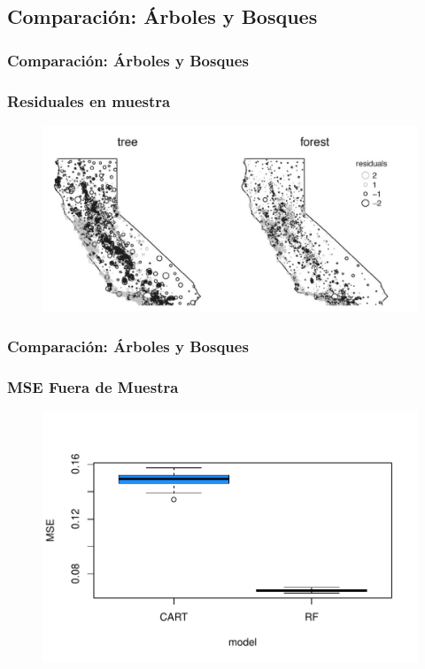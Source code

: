 \documentclass[
  shownotes,
  xcolor={svgnames},
  hyperref={colorlinks,citecolor=DarkBlue,linkcolor=DarkRed,urlcolor=DarkBlue}
  , aspectratio=169]{beamer}
\begin{document}
\subsection{Comparación: Árboles y Bosques}
\begin{frame}[fragile]
\frametitle{Comparación: Árboles y Bosques}
\frametitle{Residuales en muestra}


\begin{figure}[H] \centering
            \captionsetup{justification=centering}
              \includegraphics[scale=0.25]{figures/california}
 \end{figure}


\end{frame}

\begin{frame}[fragile]
\frametitle{Comparación: Árboles y Bosques}
\frametitle{ MSE Fuera de Muestra}


\begin{figure}[H] \centering
            \captionsetup{justification=centering}
              \includegraphics[scale=.75]{figures/mse_tree.pdf}
 \end{figure}

\end{frame}
\end{document}
